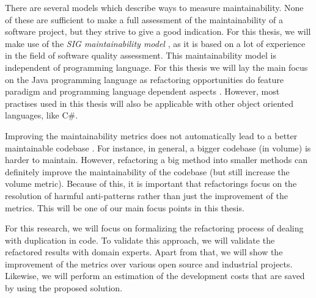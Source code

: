 \documentclass{report}
\theoremstyle{definition}
\theoremstyle{remark}
\begin{document}
There are several models which describe ways to measure maintainability. None of these are sufficient to make a full assessment of the maintainability of a software project, but they strive to give a good indication. For this thesis, we will make use of the \textit{SIG maintainability model} \cite{heitlager2007practical}, as it is based on a lot of experience in the field of software quality assessment. This maintainability model is independent of programming language. For this thesis we will lay the main focus on the Java programming language as refactoring opportunities do feature paradigm and programming language dependent aspects \cite{choi2011extracting}. However, most practises used in this thesis will also be applicable with other object oriented languages, like C\#.

Improving the maintainability metrics does not automatically lead to a better maintainable codebase \cite{fenton1999software}. For instance, in general, a bigger codebase (in volume) is harder to maintain. However, refactoring a big method into smaller methods can definitely improve the maintainability of the codebase (but still increase the volume metric). Because of this, it is important that refactorings focus on the resolution of harmful anti-patterns \cite{kapser2006cloning} rather than just the improvement of the metrics. This will be one of our main focus points in this thesis.

For this research, we will focus on formalizing the refactoring process of dealing with duplication in code. To validate this approach, we will validate the refactored results with domain experts. Apart from that, we will show the improvement of the metrics over various open source and industrial projects. Likewise, we will perform an estimation of the development costs that are saved by using the proposed solution.
\end{document}
